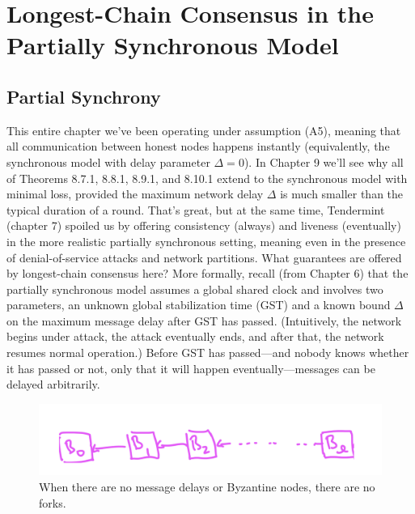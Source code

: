 \section{ Longest-Chain Consensus in the Partially Synchronous Model}

\subsection{Partial Synchrony}
This entire chapter we've been operating under assumption (A5), meaning that all communication between honest nodes happens instantly (equivalently, the synchronous model with
delay parameter $\Delta = 0$). In Chapter 9 we’ll see why all of Theorems 8.7.1, 8.8.1, 8.9.1, and 8.10.1
extend to the synchronous model with minimal loss, provided the maximum network delay $\Delta$
is much smaller than the typical duration of a round. That’s great, but at the same time, Tendermint (chapter 7) spoiled us by offering consistency (always) and liveness (eventually)
in the more realistic partially synchronous setting, meaning even in the presence of denial-of-service attacks and network partitions. What guarantees are offered by longest-chain
consensus here?
More formally, recall (from Chapter 6) that the partially synchronous model assumes a
global shared clock and involves two parameters, an unknown global stabilization time (GST)
and a known bound $\Delta$ on the maximum message delay after GST has passed. (Intuitively,
the network begins under attack, the attack eventually ends, and after that, the network
resumes normal operation.) Before GST has passed—and nobody knows whether it has
passed or not, only that it will happen eventually—messages can be delayed arbitrarily.\\

\begin{figure}[h]
    \centering
    \includegraphics[scale = 0.5]{figures/f31.png}
    \caption{When there are no message delays or Byzantine nodes, there are no forks.}
    \label{fig:mesh1}
\end{figure}\\

